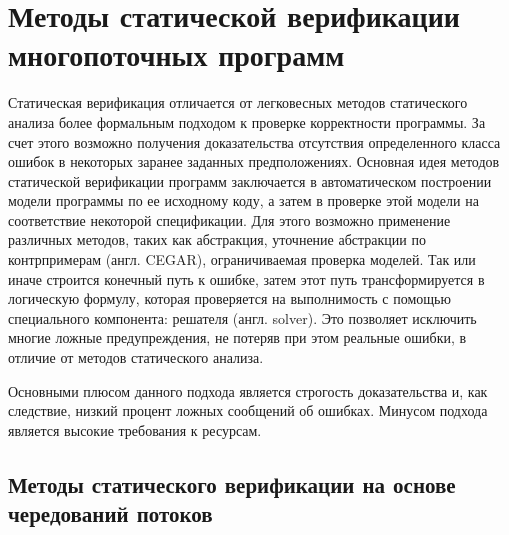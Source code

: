 
\section{Методы статической верификации многопоточных программ}
\label{rw:bmc}

Статическая верификация отличается от легковесных методов статического анализа более формальным подходом к проверке корректности программы.
За счет этого возможно получения доказательства отсутствия определенного класса ошибок в некоторых заранее заданных предположениях.
%
%
Основная идея методов статической верификации программ заключается в автоматическом построении модели программы по ее исходному коду, а затем в проверке этой модели на соответствие некоторой спецификации.
Для этого возможно применение различных методов, таких как абстракция, уточнение абстракции по контрпримерам (англ. CEGAR), ограничиваемая проверка моделей.
Так или иначе строится конечный путь к ошибке, затем этот путь трансформируется в логическую формулу, которая проверяется на выполнимость с помощью специального компонента: решателя (англ. solver).
Это позволяет исключить многие ложные предупреждения, не потеряв при этом реальные ошибки, в отличие от методов статического анализа.

Основными плюсом данного подхода является строгость доказательства и, как следствие, низкий процент ложных сообщений об ошибках.
Минусом подхода является высокие требования к ресурсам.

\subsection{Методы статического верификации на основе чередований потоков}

